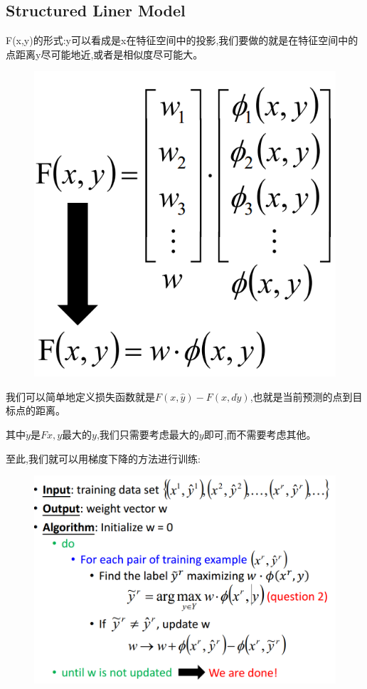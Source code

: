 \documentclass[UTF8,a4paper]{ctexart}
\begin{document}
        \subsection{Structured Liner Model}
        F(x,y)的形式:y可以看成是x在特征空间中的投影,我们要做的就是在特征空间中的点距离y尽可能地近,或者是相似度尽可能大。
        \begin{figure}[H]
            \centering
            \includegraphics[scale = 0.3]{assets/ML_eca3e.png}
        \end{figure}

        我们可以简单地定义损失函数就是$F(x,\hat{y}) - F(x,d\dot y)$,也就是当前预测的点到目标点的距离。

        其中$\dot y$是$F{x,y}$最大的$y$,我们只需要考虑最大的$y$即可,而不需要考虑其他。

        至此,我们就可以用梯度下降的方法进行训练:
        \begin{figure}[H]
            \centering
            \includegraphics[scale = 0.3]{assets/ML_7db22.png}
        \end{figure}
\end{document}
